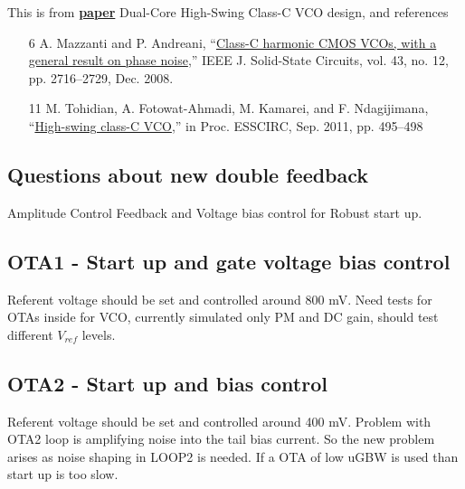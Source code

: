 \documentclass{article}
\begin{document}
This is from \href{https://www.semanticscholar.org/paper/Dual-Core-High-Swing-Class-C-VCO-design-Kim-Kim/c9551af0809604f76263af49976df9efc213bb8e}{\textbf{paper}} Dual-Core High-Swing Class-C VCO design, and references 


\begin{itemize}
	\item [6] A. Mazzanti and P. Andreani, “\href{https://ieeexplore.ieee.org/document/4684621}{Class-C harmonic CMOS
	VCOs, with a general result on phase noise},” IEEE J.
	Solid-State Circuits, vol. 43, no. 12, pp. 2716–2729,
	Dec. 2008.
	\item [11] M. Tohidian, A. Fotowat-Ahmadi, M. Kamarei, and F.
	Ndagijimana, “\href{https://ieeexplore.ieee.org/document/6045015}{High-swing class-C VCO},” in Proc.
	ESSCIRC, Sep. 2011, pp. 495–498
\end{itemize}


\subsection{Questions about new double feedback}


Amplitude Control Feedback and Voltage bias control for Robust start up. 



\subsection{OTA1 - Start up  and gate voltage bias control}

Referent voltage should be set and controlled around 800 mV. Need tests for OTAs inside for VCO, currently simulated only PM and DC gain, should test different $V_{ref}$ levels.

\subsection{OTA2 - Start up and bias control}

Referent voltage should be set and controlled around 400 mV. Problem with OTA2 loop is amplifying noise into the tail bias current. So the new problem arises as noise shaping in LOOP2 is needed. If a OTA of low uGBW is used than start up is too slow.


\end{document}
